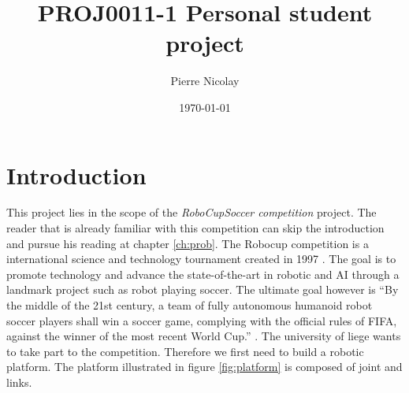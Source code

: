 \documentclass[12pt,a4paper]{report}
\title{PROJ0011-1 Personal student project}
\author{Pierre Nicolay}
\date{\today}
\newcommand{\HRule}{\rule{\linewidth}{0.5mm}}
\begin{document}

\tableofcontents

\newpage
\chapter{Introduction}
\label{ch:intro}
This project lies in the scope of the \emph{RoboCupSoccer competition} project. The reader that is already familiar with this competition can skip the introduction and pursue his reading at chapter \ref{ch:prob}.\newline
The Robocup competition is a international science and technology tournament created in 1997 \cite{robocupHistory}. The goal is to promote technology and advance the state-of-the-art in robotic and AI through a landmark project such as robot playing soccer. The ultimate goal however is ``By the middle of the 21st century, a team of fully autonomous humanoid robot soccer players shall win a soccer game, complying with the official rules of FIFA, against the winner of the most recent World Cup.'' \cite{RobocupObjective}.\newline
The university of liege wants to take part to the competition. Therefore we first need to build a robotic platform. The platform illustrated in figure \ref{fig:platform} is composed of joint and links. 
\end{document}
